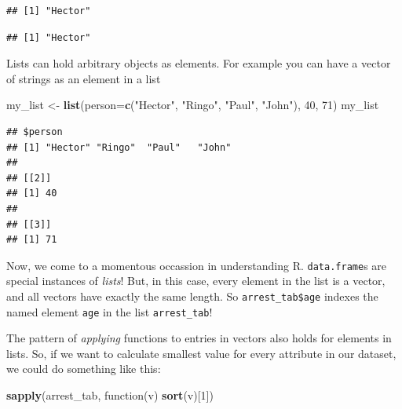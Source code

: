 \documentclass[]{article}
\newenvironment{Shaded}{\begin{snugshade}}{\end{snugshade}}
\newcommand{\KeywordTok}[1]{\textcolor[rgb]{0.13,0.29,0.53}{\textbf{{#1}}}}
\newcommand{\DataTypeTok}[1]{\textcolor[rgb]{0.13,0.29,0.53}{{#1}}}
\newcommand{\DecValTok}[1]{\textcolor[rgb]{0.00,0.00,0.81}{{#1}}}
\newcommand{\StringTok}[1]{\textcolor[rgb]{0.31,0.60,0.02}{{#1}}}
\newcommand{\NormalTok}[1]{{#1}}
\theoremstyle{definition}
\theoremstyle{definition}
\theoremstyle{remark}
\begin{document}
\begin{verbatim}
## [1] "Hector"
\end{verbatim}

\begin{Shaded}
\end{Shaded}

\begin{verbatim}
## [1] "Hector"
\end{verbatim}

Lists can hold arbitrary objects as elements. For example you can have a
vector of strings as an element in a list

\begin{Shaded}
\begin{Highlighting}[]
\NormalTok{my_list <-}\StringTok{ }\KeywordTok{list}\NormalTok{(}\DataTypeTok{person=}\KeywordTok{c}\NormalTok{(}\StringTok{"Hector"}\NormalTok{, }\StringTok{"Ringo"}\NormalTok{, }\StringTok{"Paul"}\NormalTok{, }\StringTok{"John"}\NormalTok{), }\DecValTok{40}\NormalTok{, }\DecValTok{71}\NormalTok{)}
\NormalTok{my_list}
\end{Highlighting}
\end{Shaded}

\begin{verbatim}
## $person
## [1] "Hector" "Ringo"  "Paul"   "John"  
## 
## [[2]]
## [1] 40
## 
## [[3]]
## [1] 71
\end{verbatim}

Now, we come to a momentous occassion in understanding R.
\texttt{data.frame}s are special instances of \emph{lists}! But, in this
case, every element in the list is a vector, and all vectors have
exactly the same length. So \texttt{arrest\_tab\$age} indexes the named
element \texttt{age} in the list \texttt{arrest\_tab}!

The pattern of \emph{applying} functions to entries in vectors also
holds for elements in lists. So, if we want to calculate smallest value
for every attribute in our dataset, we could do something like this:

\begin{Shaded}
\begin{Highlighting}[]
\KeywordTok{sapply}\NormalTok{(arrest_tab, function(v) }\KeywordTok{sort}\NormalTok{(v)[}\DecValTok{1}\NormalTok{])}
\end{Highlighting}
\end{Shaded}
\end{document}
